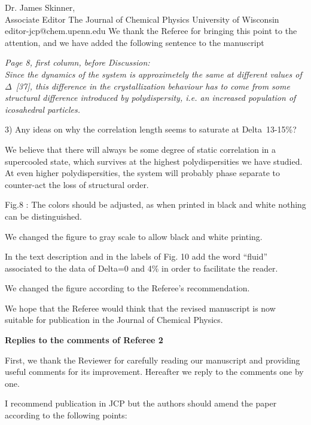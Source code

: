 \documentclass[a4paper, rebuttal, parskip=true, firsthead=false, fromemail=false, foldmarks=false]{scrlttr2}
\begin{document}
\begin{letter}{Dr. James Skinner,\\Associate Editor
The Journal of Chemical Physics
University of Wisconsin\\
editor-jcp@chem.upenn.edu }
We thank the Referee for bringing this point to the attention, and we have added the following sentence to the manuscript

{\it Page 8, first column, before Discussion:\\
Since the dynamics of the
system is approximetely the same at different values of $\Delta$~[37], this difference in the crystallization behaviour has to come from
some structural difference introduced by polydispersity, i.e. an increased population of icosahedral particles.}


\begin{quotationi}
3) Any ideas on why the correlation length seems to saturate at Delta~13-15\%?
\end{quotationi}

We believe that there will always be some degree of static correlation in a supercooled state, which
survives at the highest polydispersities we have studied. At even higher polydispersities, the system
will probably phase separate to counter-act the loss of structural order.


\begin{quotationi}
Fig.8 : The colors should be adjusted, as when printed in black and white nothing can be distinguished.
\end{quotationi}
We changed the figure to gray scale to allow black and white printing.

\begin{quotationi}
In the text description and in the labels of Fig. 10 add the word ``fluid'' associated to the data of Delta=0 and 4\% in order to facilitate the reader.
\end{quotationi}
We changed the figure according to the Referee's recommendation.

We hope that the Referee would think that the revised manuscript is now suitable for publication in the Journal of Chemical Physics. 

\clearpage

\textsf{\textbf{Replies to the comments of Referee 2}}

First, we thank the Reviewer for carefully reading our manuscript and providing useful comments for its improvement. 
Hereafter we reply to the comments one by one.

\begin{quotationi}

I recommend publication in JCP but the authors should amend the paper
according to the following points:


\end{quotationi}
\end{letter}
\end{document}
